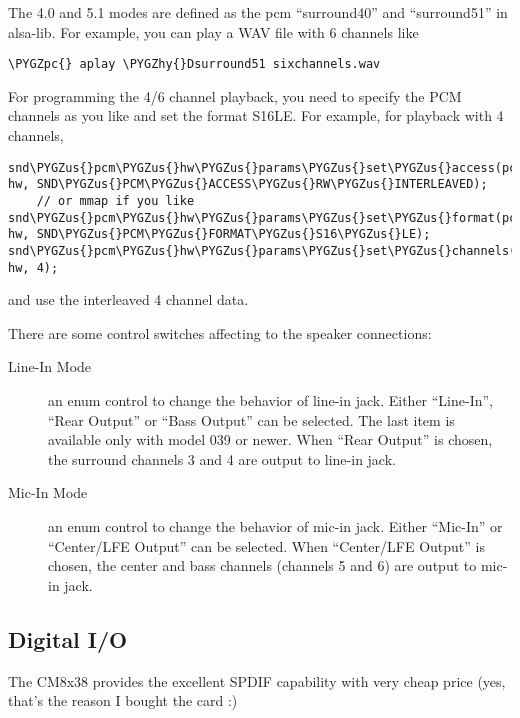 \documentclass[a4paper,8pt,english]{sphinxmanual}
\def\PYGZus{\char`\_}
\def\PYGZpc{\char`\%}
\def\PYGZhy{\char`\-}
\begin{document}
The 4.0 and 5.1 modes are defined as the pcm ``surround40'' and ``surround51''
in alsa-lib.  For example, you can play a WAV file with 6 channels like

\begin{Verbatim}[commandchars=\\\{\}]
\PYGZpc{} aplay \PYGZhy{}Dsurround51 sixchannels.wav
\end{Verbatim}

For programming the 4/6 channel playback, you need to specify the PCM
channels as you like and set the format S16LE.  For example, for playback
with 4 channels,

\begin{Verbatim}[commandchars=\\\{\}]
snd\PYGZus{}pcm\PYGZus{}hw\PYGZus{}params\PYGZus{}set\PYGZus{}access(pcm, hw, SND\PYGZus{}PCM\PYGZus{}ACCESS\PYGZus{}RW\PYGZus{}INTERLEAVED);
    // or mmap if you like
snd\PYGZus{}pcm\PYGZus{}hw\PYGZus{}params\PYGZus{}set\PYGZus{}format(pcm, hw, SND\PYGZus{}PCM\PYGZus{}FORMAT\PYGZus{}S16\PYGZus{}LE);
snd\PYGZus{}pcm\PYGZus{}hw\PYGZus{}params\PYGZus{}set\PYGZus{}channels(pcm, hw, 4);
\end{Verbatim}

and use the interleaved 4 channel data.

There are some control switches affecting to the speaker connections:
\begin{description}
\item[{Line-In Mode}] \leavevmode
an enum control to change the behavior of line-in
jack.  Either ``Line-In'', ``Rear Output'' or ``Bass Output'' can
be selected.  The last item is available only with model 039
or newer.
When ``Rear Output'' is chosen, the surround channels 3 and 4
are output to line-in jack.

\item[{Mic-In Mode}] \leavevmode
an enum control to change the behavior of mic-in
jack.  Either ``Mic-In'' or ``Center/LFE Output'' can be
selected.
When ``Center/LFE Output'' is chosen, the center and bass
channels (channels 5 and 6) are output to mic-in jack.

\end{description}


\subsection{Digital I/O}
\label{sound/cards/cmipci:digital-i-o}
The CM8x38 provides the excellent SPDIF capability with very cheap
price (yes, that's the reason I bought the card :)
\end{document}
